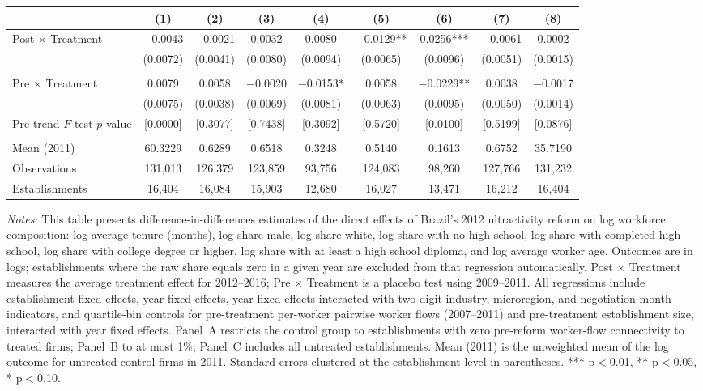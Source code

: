 \begin{table}[H]
\begin{threeparttable}
{\begin{tabular}{lcccccccc}
 & (1) & (2) & (3) & (4) & (5) & (6) & (7) & (8) \\
\midrule
Post $\times$ Treatment & $-$0.0043 & $-$0.0021 & 0.0032 & 0.0080 & $-$0.0129** & 0.0256*** & $-$0.0061 & 0.0002 \\
  & (0.0072) & (0.0041) & (0.0080) & (0.0094) & (0.0065) & (0.0096) & (0.0051) & (0.0015) \\
  &  &  &  &  &  &  &  & \\
Pre $\times$ Treatment & 0.0079 & 0.0058 & $-$0.0020 & $-$0.0153* & 0.0058 & $-$0.0229** & 0.0038 & $-$0.0017 \\
  & (0.0075) & (0.0038) & (0.0069) & (0.0081) & (0.0063) & (0.0095) & (0.0050) & (0.0014) \\
Pre-trend $F$-test $p$-value & [0.0000] & [0.3077] & [0.7438] & [0.3092] & [0.5720] & [0.0100] & [0.5199] & [0.0876] \\
  &  &  &  &  &  &  &  & \\
Mean (2011) & 60.3229 & 0.6289 & 0.6518 & 0.3248 & 0.5140 & 0.1613 & 0.6752 & 35.7190 \\
Observations & 131{,}013 & 126{,}379 & 123{,}859 & 93{,}756 & 124{,}083 & 98{,}260 & 127{,}766 & 131{,}232 \\
Establishments & 16{,}404 & 16{,}084 & 15{,}903 & 12{,}680 & 16{,}027 & 13{,}471 & 16{,}212 & 16{,}404 \\
\bottomrule
\end{tabular}%
}
\scriptsize
\begin{tablenotes}
\item \textit{Notes:} This table presents difference-in-differences estimates of the direct effects of Brazil's 2012 ultractivity reform on log workforce composition: log average tenure (months), log share male, log share white, log share with no high school, log share with completed high school, log share with college degree or higher, log share with at least a high school diploma, and log average worker age. Outcomes are in logs; establishments where the raw share equals zero in a given year are excluded from that regression automatically. Post $\times$ Treatment measures the average treatment effect for 2012--2016; Pre $\times$ Treatment is a placebo test using 2009--2011. All regressions include establishment fixed effects, year fixed effects, year fixed effects interacted with two-digit industry, microregion, and negotiation-month indicators, and quartile-bin controls for pre-treatment per-worker pairwise worker flows (2007--2011) and pre-treatment establishment size, interacted with year fixed effects. Panel~A restricts the control group to establishments with zero pre-reform worker-flow connectivity to treated firms; Panel~B to at most 1\%; Panel~C includes all untreated establishments. Mean (2011) is the unweighted mean of the log outcome for untreated control firms in 2011. Standard errors clustered at the establishment level in parentheses. *** p$<$0.01, ** p$<$0.05, * p$<$0.10.
\end{tablenotes}
\end{threeparttable}
\end{table}


